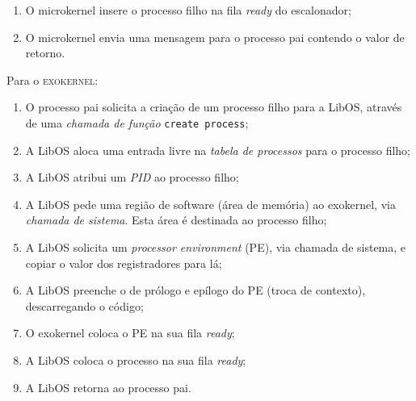 \begin{exercicio}
\begin{enumerate}
    \item O microkernel insere o processo filho na fila \textit{ready} do escalonador;

    \item O microkernel envia uma mensagem para o processo pai contendo o valor de retorno.
  \end{enumerate}

  Para o \textsc{exokernel}:
  \begin{enumerate}
    \item O processo pai solicita a criação de um processo filho para a LibOS, através de uma \textit{chamada de função} \texttt{create process};

    \item A LibOS aloca uma entrada livre na \textit{tabela de processos} para o processo filho;

    \item A LibOS atribui um \textit{PID} ao processo filho;

    \item A LibOS pede uma região de software (área de memória) ao exokernel, via \textit{chamada de sistema}. Esta área é destinada ao processo filho;

    \item A LibOS solicita um \textit{processor environment} (PE), via chamada de sistema, e copiar o valor dos registradores para lá;

    \item A LibOS preenche o de prólogo e epílogo do PE (troca de contexto), descarregando o código;

    \item O exokernel coloca o PE na sua fila \textit{ready};

    \item A LibOS coloca o processo na sua fila \textit{ready};

    \item A LibOS retorna ao processo pai.
  \end{enumerate}

\end{exercicio}

